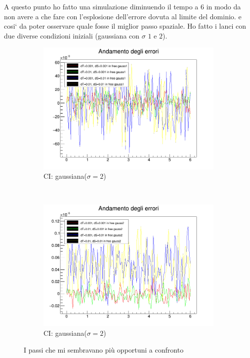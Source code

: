 A questo punto ho fatto una simulazione diminuendo il tempo a $6$ in modo da non avere a che fare con l'esplosione dell'errore dovuta al limite del dominio. e cosi` da poter osservare quale fosse il miglior passo spaziale. Ho fatto i lanci con due diverse condizioni iniziali (gaussiana con $\sigma$ $1$ e $2$). 

\begin{figure}[htb]
	\centering
	\begin{subfigure}[b]{0.49\textwidth}
		\includegraphics[width=\textwidth]{IMG/eChoosy1}
		\caption{CI: gaussiana($\sigma=2$)}
	\end{subfigure}
	~
	\begin{subfigure}[b]{0.49\textwidth}
		\includegraphics[width=\textwidth]{IMG/eChoosy2}
		\caption{CI: gaussiana($\sigma=2$)}
	\end{subfigure}
	\caption{I passi che mi sembravano pi\`u opportuni a confronto}\label{fig:SceltaErrori}
\end{figure}

